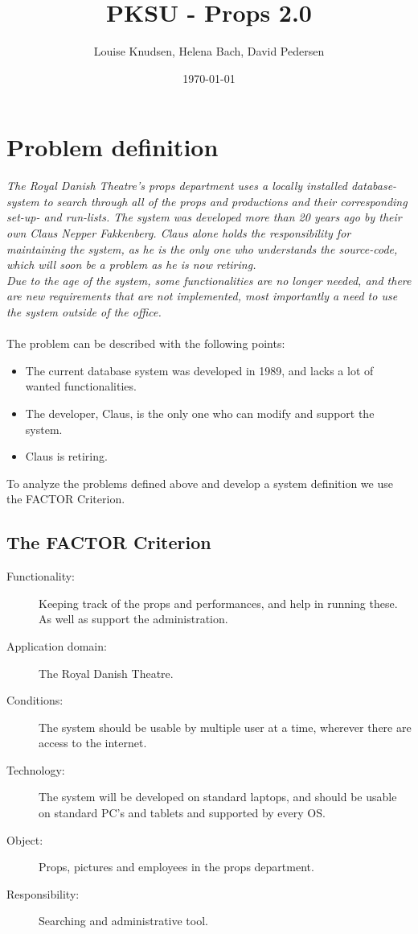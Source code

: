 \documentclass[12pt]{article}
\title{PKSU - Props 2.0}
\author{Louise Knudsen, Helena Bach, David Pedersen}
\date{\today}
\begin{document}
\maketitle
\section{Problem definition}
\textit{The Royal Danish Theatre's props department uses a locally installed database-system to search through all of the props and productions and their corresponding set-up- and run-lists. The system was developed more than 20 years ago by their own Claus Nepper Fakkenberg. Claus alone holds the responsibility for maintaining the system, as he is the only one who understands the source-code, which will soon be a problem as he is now retiring. \\
Due to the age of the system, some functionalities are no longer needed, and there are new requirements that are not implemented, most importantly a need to use the system outside of the office.} \\\\
The problem can be described with the following points:
\begin{itemize}
\item The current database system was developed in 1989, and lacks a lot of wanted functionalities.
\item The developer, Claus, is the only one who can modify and support the system.
\item Claus is retiring.
\end{itemize}
To analyze the problems defined above and develop a system definition we use the FACTOR Criterion.
\subsection{The FACTOR Criterion}
\begin{description}
  \item[Functionality:] Keeping track of the props and performances, and help in running these. As well as support the administration.
  \item[Application domain:] The Royal Danish Theatre.
  \item[Conditions:] The system should be usable by multiple user at a time, wherever there are access to the internet.
  \item[Technology:] The system will be developed on standard laptops, and should be usable on standard PC's and tablets and supported by every OS.
  \item[Object:] Props, pictures and employees in the props department.
  \item[Responsibility:] Searching and administrative tool.
\end{description}
\end{document}
